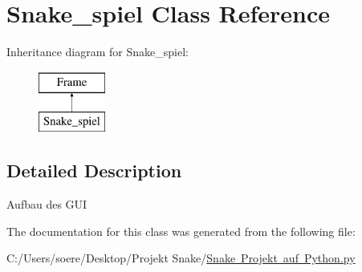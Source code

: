 \hypertarget{class_snake_01_projekt_01auf_01_python_1_1_snake__spiel}{}\section{Snake\+\_\+spiel Class Reference}
\label{class_snake_01_projekt_01auf_01_python_1_1_snake__spiel}
Inheritance diagram for Snake\+\_\+spiel\+:\begin{figure}[H]
\begin{center}
\leavevmode
\includegraphics[height=2.000000cm]{class_snake_01_projekt_01auf_01_python_1_1_snake__spiel}
\end{center}
\end{figure}


\subsection{Detailed Description}
\begin{DoxyVerb}Aufbau des GUI\end{DoxyVerb}
 

The documentation for this class was generated from the following file\+:\begin{DoxyCompactItemize}
\item 
C\+:/\+Users/soere/\+Desktop/\+Projekt Snake/\mbox{\hyperlink{_snake_01_projekt_01auf_01_python_8py}{Snake Projekt auf Python.\+py}}\end{DoxyCompactItemize}
